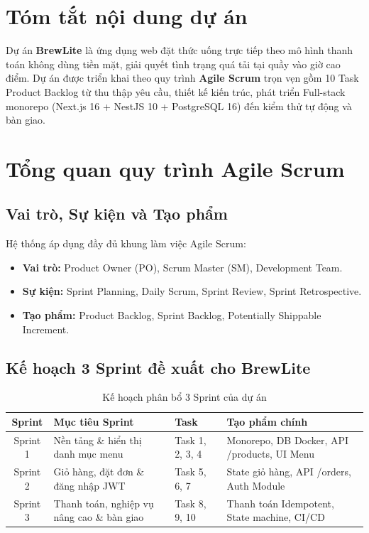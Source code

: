 \documentclass[a4paper]{article}
\begin{document}
\thispagestyle{empty}
\newpage
\tableofcontents
\newpage

\section{Tóm tắt nội dung dự án}
Dự án \textbf{BrewLite} là ứng dụng web đặt thức uống trực tiếp theo mô hình thanh toán không dùng tiền mặt, giải quyết tình trạng quá tải tại quầy vào giờ cao điểm. Dự án được triển khai theo quy trình \textbf{Agile Scrum} trọn vẹn gồm 10 Task Product Backlog từ thu thập yêu cầu, thiết kế kiến trúc, phát triển Full-stack monorepo (Next.js 16 + NestJS 10 + PostgreSQL 16) đến kiểm thử tự động và bàn giao.

\section{Tổng quan quy trình Agile Scrum}
\subsection{Vai trò, Sự kiện và Tạo phẩm}
Hệ thống áp dụng đầy đủ khung làm việc Agile Scrum:
\begin{itemize}
    \item \textbf{Vai trò:} Product Owner (PO), Scrum Master (SM), Development Team.
    \item \textbf{Sự kiện:} Sprint Planning, Daily Scrum, Sprint Review, Sprint Retrospective.
    \item \textbf{Tạo phẩm:} Product Backlog, Sprint Backlog, Potentially Shippable Increment.
\end{itemize}

\subsection{Kế hoạch 3 Sprint đề xuất cho BrewLite}
\begin{table}[h!]
\centering
\begin{tabularx}{\textwidth}{|c|X|l|X|}
\hline
\textbf{Sprint} & \textbf{Mục tiêu Sprint} & \textbf{Task} & \textbf{Tạo phẩm chính} \\ \hline
Sprint 1 & Nền tảng \& hiển thị danh mục menu & Task 1, 2, 3, 4 & Monorepo, DB Docker, API /products, UI Menu \\ \hline
Sprint 2 & Giỏ hàng, đặt đơn \& đăng nhập JWT & Task 5, 6, 7 & State giỏ hàng, API /orders, Auth Module \\ \hline
Sprint 3 & Thanh toán, nghiệp vụ nâng cao \& bàn giao & Task 8, 9, 10 & Thanh toán Idempotent, State machine, CI/CD \\ \hline
\end{tabularx}
\caption{Kế hoạch phân bổ 3 Sprint của dự án}
\end{table}
\end{document}
